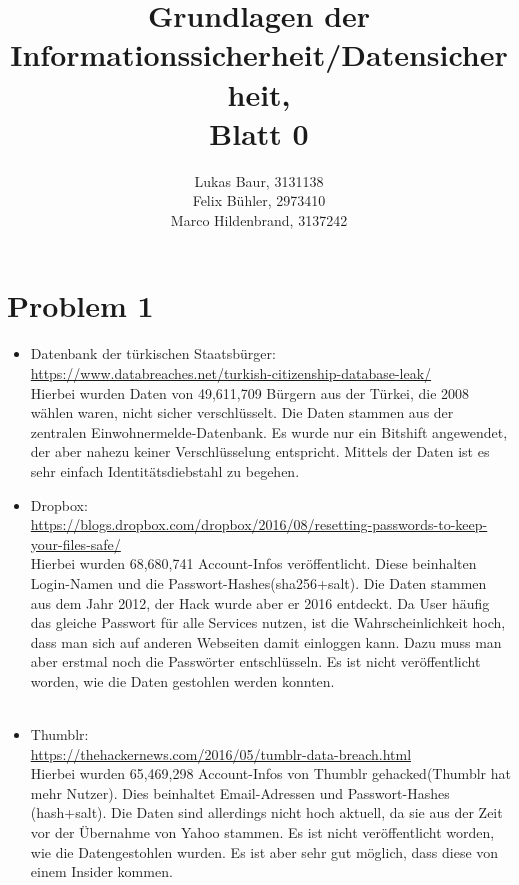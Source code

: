 \documentclass[12pt,pdftex,a4paper]{article}
\begin{document}
\title{ Grundlagen der Informationssicherheit/Datensicherheit,\\ Blatt 0}
\author{Lukas Baur, 3131138\\
		Felix Bühler, 2973410\\
		Marco Hildenbrand, 3137242}
\maketitle
\section*{Problem 1}
\begin{itemize}
	\item Datenbank der türkischen Staatsbürger:\\
	\url{https://www.databreaches.net/turkish-citizenship-database-leak/}\\
	Hierbei wurden Daten von 49,611,709 Bürgern aus der Türkei, die 2008 wählen waren, nicht sicher verschlüsselt. Die Daten stammen  aus der zentralen Einwohnermelde-Datenbank. Es wurde nur ein Bitshift angewendet, der aber nahezu keiner Verschlüsselung entspricht. Mittels der Daten ist es sehr einfach Identitätsdiebstahl zu begehen.
	
	\item Dropbox:\\
	\url{https://blogs.dropbox.com/dropbox/2016/08/resetting-passwords-to-keep-your-files-safe/}\\
	Hierbei wurden 68,680,741 Account-Infos veröffentlicht. Diese beinhalten Login-Namen und die Passwort-Hashes(sha256+salt). Die Daten stammen aus dem Jahr 2012, der Hack wurde aber er 2016 entdeckt. Da User häufig das gleiche Passwort für alle Services nutzen, ist die Wahrscheinlichkeit hoch, dass man sich auf anderen Webseiten damit einloggen kann. Dazu muss man aber erstmal noch die Passwörter entschlüsseln. Es ist nicht veröffentlicht worden, wie die Daten gestohlen werden konnten.\\\\
	
	\item Thumblr:\\
	\url{https://thehackernews.com/2016/05/tumblr-data-breach.html}\\
	Hierbei wurden 65,469,298 Account-Infos von Thumblr gehacked(Thumblr hat mehr Nutzer). Dies beinhaltet Email-Adressen und Passwort-Hashes (hash+salt). Die Daten sind allerdings nicht hoch aktuell, da sie aus der Zeit vor der Übernahme von Yahoo stammen. Es ist nicht veröffentlicht worden, wie die Datengestohlen wurden. Es ist aber sehr gut möglich, dass diese von einem Insider kommen.
	
\end{itemize}
\end{document}
